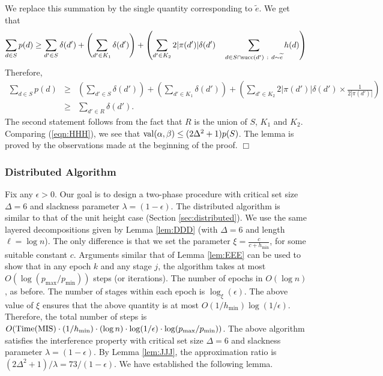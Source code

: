 \documentclass[11pt]{article}
\newcommand{\qed} {\hfill$\Box$}
\newcommand{\wt}[1] {\widetilde{#1}}
\newcommand{\val} {{\rm val}}
\newcommand{\mysucc} {{\rm succ}}
\newcommand{\TMIS} {{\rm Time(MIS)}}
\newcommand{\hmin} {h_{\min}}
\begin{document}
We replace this summation by the single quantity corresponding to $\wt{e}$.
We get that
\begin{eqnarray*}
\sum_{d\in S} p(d) 
\geq
\sum_{d'\in S} \delta(d') 
+ \left(\sum_{d'\in K_1} \delta(d')\right)
+ \left(\sum_{d'\in K_2} 2 |\pi(d')|\delta(d') \quad \sum_{d\in S\cap \mysucc(d')~:~d\sim \wt{e}} h(d)\right)
\end{eqnarray*}
Therefore,
\begin{eqnarray*}
\sum_{d\in S} p(d) 
&\geq& \left(\sum_{d'\in S} \delta(d')\right) + \left(\sum_{d'\in K_1} \delta(d')\right) 
+ \left(\sum_{d'\in K_2} 2 |\pi(d')|\delta(d') \times \frac{1}{2|\pi(d')|}\right)\\
&\geq& \sum_{d' \in R} \delta(d').
\end{eqnarray*}
The second statement follows from the fact that $R$ is the union of $S$, $K_1$ and $K_2$.
Comparing (\ref{eqn:HHH}), we see that $\val(\alpha,\beta)\leq (2\Delta^2+1)p(S)$.
The lemma is proved by the observations made at the beginning of the proof.
\qed

\subsubsection*{Distributed Algorithm}
Fix any $\epsilon > 0$. 
Our goal is to design a two-phase procedure with critical set size $\Delta=6$ and slackness parameter 
$\lambda=(1-\epsilon)$.
The distributed algorithm is similar to that of the unit height case (Section \ref{sec:distributed}).
We use the same layered decompositions given by Lemma \ref{lem:DDD} (with $\Delta=6$ and length $\ell=\log n$).
The only difference is that we set the parameter $\xi=\frac{c}{c+\hmin}$, for some suitable constant $c$.
Arguments similar that of Lemma \ref{lem:EEE} can be used to show that in any epoch $k$ and any stage $j$,
the algorithm takes at most $O(\log (p_{\max}/p_{\min}))$ steps (or iterations).
The number of epochs in $O(\log n)$, as before.
The number of stages within each epoch is $\log_{\xi}(\epsilon)$.
The above value of $\xi$ ensures that the above quantity is at most $O(1/\hmin)\log(1/\epsilon)$.
Therefore, the total number of steps is 
$O(\TMIS \cdot (1/h_{\min}) \cdot (\log n) \cdot \log(1/\epsilon) \cdot \log(p_{\max}/p_{\min}))$.
The above algorithm satisfies the interference property with critical set size $\Delta=6$ and slackness
parameter $\lambda = (1-\epsilon)$. By Lemma \ref{lem:JJJ}, 
the approximation ratio is $(2\Delta^2+1)/\lambda = 73/(1-\epsilon)$.
We have established the following lemma.
\end{document}
